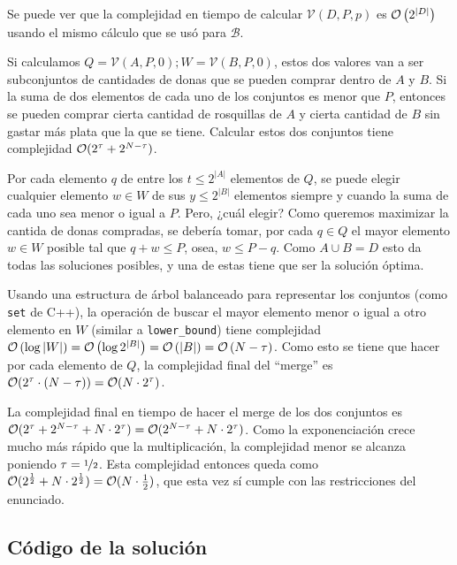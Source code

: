 Se puede ver que la complejidad en tiempo de calcular \( \mathcal{V}(D, P, p) \) es \( \mathcal{O} \left( 2^{\left| D \right|} \right) \) usando el mismo cálculo que se usó para \( \mathcal{B} \).

Si calculamos \( Q = \mathcal{V}(A, P, 0); W = \mathcal{V}(B, P, 0) \), estos dos valores van a ser subconjuntos de cantidades de donas que se pueden comprar dentro de \( A \) y \( B \). Si la suma de dos elementos de cada uno de los conjuntos es menor que \( P \), entonces se pueden comprar cierta cantidad de rosquillas de \( A \) y cierta cantidad de \( B \) sin gastar más plata que la que se tiene. Calcular estos dos conjuntos tiene complejidad \( \mathcal{O}(2^\tau + 2^{N - \tau}) \).

Por cada elemento \( q \) de entre los \( t \leq 2^{\left| A \right|} \) elementos de \( Q \), se puede elegir cualquier elemento \( w \in W \) de sus \( y \leq 2^{\left| B \right|} \) elementos siempre y cuando la suma de cada uno sea menor o igual a \( P \). Pero, ¿cuál elegir? Como queremos maximizar la cantida de donas compradas, se debería tomar, por cada \( q \in Q \) el mayor elemento \( w \in W \) posible tal que \( q + w \leq P \), osea, \( w \leq P - q \). Como \( A \cup B = D \) esto da todas las soluciones posibles, y una de estas tiene que ser la solución óptima.

Usando una estructura de árbol balanceado para representar los conjuntos (como \texttt{set} de C++), la operación de buscar el mayor elemento menor o igual a otro elemento en \( W \) (similar a \texttt{lower\_bound}) tiene complejidad \( \mathcal{O} \left( \log \left| W \right| \right) = \mathcal{O} \left( \log 2^{\left| B \right|} \right) = \mathcal{O} \left( \left| B \right| \right) = \mathcal{O} \left( N - \tau \right) \). Como esto se tiene que hacer por cada elemento de \( Q \), la complejidad final del ``merge'' es \( \mathcal{O} (2^\tau \cdot (N - \tau)) = \mathcal{O} (N \cdot 2^\tau) \).

La complejidad final en tiempo de hacer el merge de los dos conjuntos es \( \mathcal{O}(2^\tau + 2^{N - \tau} + N \cdot 2^\tau) = \mathcal{O}(2^{N - \tau} + N \cdot 2^\tau) \). Como la exponenciación crece mucho más rápido que la multiplicación, la complejidad menor se alcanza poniendo \( \tau = \nicefrac{1}{2} \). Esta complejidad entonces queda como \( \mathcal{O}(2^\frac{1}{2} + N \cdot 2^\frac{1}{2}) = \mathcal{O}(N \cdot \frac{1}{2}) \), que esta vez sí cumple con las restricciones del enunciado.

\newpage{}

\subsection{Código de la solución}

